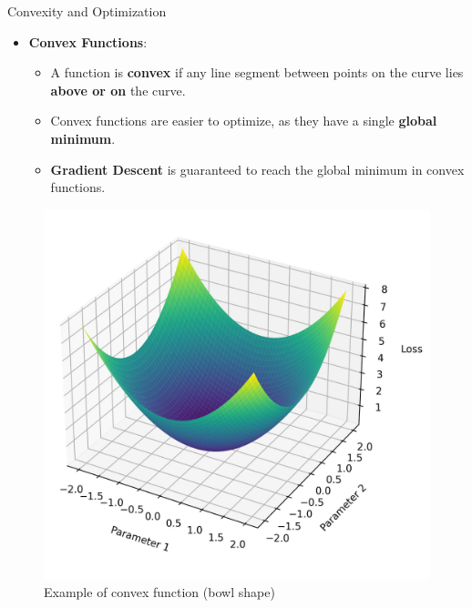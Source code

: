 \documentclass[serif, aspectratio=169]{beamer}
\begin{document}
\begin{frame}{Convexity and Optimization}
    \begin{itemize}
        \item \textbf{Convex Functions}:
        \begin{itemize}
            \item A function is \textbf{convex} if any line segment between points on the curve lies \textbf{above or on} the curve.
            \item Convex functions are easier to optimize, as they have a single \textbf{global minimum}.
            \item \textbf{Gradient Descent} is guaranteed to reach the global minimum in convex functions.
        \end{itemize}
    \end{itemize}
    \begin{figure}[h]
        \centering
        \includegraphics[height=0.5\textheight]{pic/loss_convex.jpg}
        \caption{Example of convex function (bowl shape)}
    \end{figure}
\end{frame}
\end{document}

